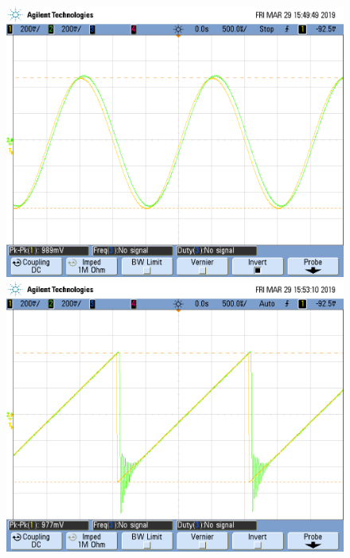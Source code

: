\documentclass[../../ASSD_TP1_G7.tex]{subfiles}
\begin{document}
\begin{figure}[H]

\begin{centering}
\includegraphics[scale=0.25]{Imagenes/syh_pto_bsin}\includegraphics[scale=0.25]{Imagenes/syh_pto_bcuad_1}
\par\end{centering}
\begin{centering}

\end{centering}
\end{figure}
\end{document}
